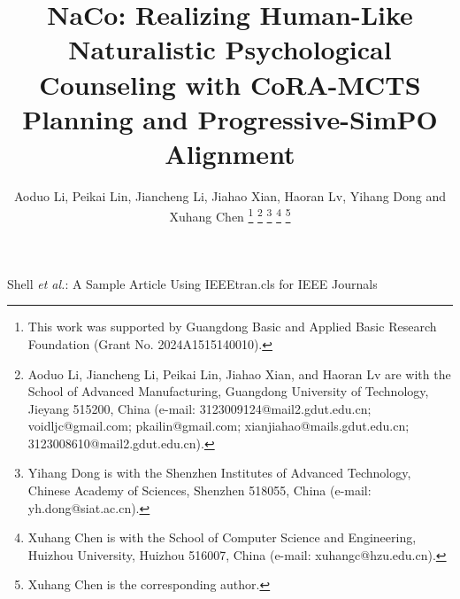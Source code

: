 \documentclass[lettersize,journal]{IEEEtran}
\begin{document}
\title{NaCo: Realizing Human-Like Naturalistic Psychological Counseling with CoRA-MCTS Planning and Progressive-SimPO Alignment}

\author{Aoduo Li, Peikai Lin, Jiancheng Li, Jiahao Xian, Haoran Lv, Yihang Dong and Xuhang Chen
\thanks{This work was supported by Guangdong Basic and Applied Basic Research Foundation (Grant No. 2024A1515140010).}
\thanks{Aoduo Li, Jiancheng Li, Peikai Lin, Jiahao Xian, and Haoran Lv are with the School of Advanced Manufacturing, Guangdong University of Technology, Jieyang 515200, China (e-mail: 3123009124@mail2.gdut.edu.cn; voidljc@gmail.com; pkailin@gmail.com; xianjiahao@mails.gdut.edu.cn; 3123008610@mail2.gdut.edu.cn).}
\thanks{Yihang Dong is with the Shenzhen Institutes of Advanced Technology, Chinese Academy of Sciences, Shenzhen 518055, China (e-mail: yh.dong@siat.ac.cn).}
\thanks{Xuhang Chen is with the School of Computer Science and Engineering, Huizhou University, Huizhou 516007, China (e-mail: xuhangc@hzu.edu.cn).}
\thanks{Xuhang Chen is the corresponding author.}
}

%
{Shell \MakeLowercase{\textit{et al.}}: A Sample Article Using IEEEtran.cls for IEEE Journals}


\maketitle
\end{document}

